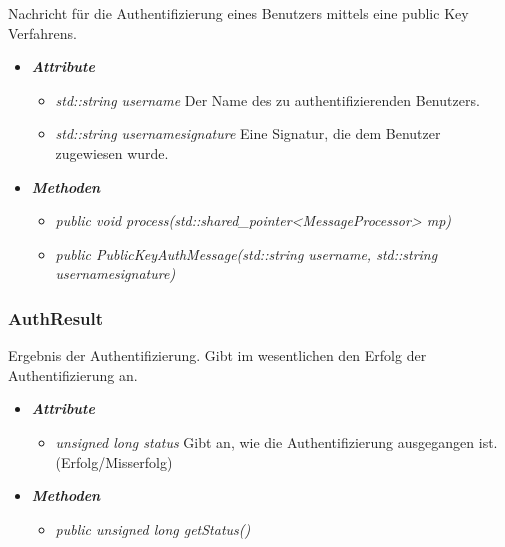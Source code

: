 \documentclass[a4paper,12pt]{article}
\begin{document}
Nachricht für die Authentifizierung eines Benutzers mittels eine public Key Verfahrens.

	\begin{itemize}[label={}]

	\item\textit{\textbf{Attribute}}
		\begin{itemize}[label={\textbullet}]
			
			\item\textit{std::string username} Der Name des zu authentifizierenden Benutzers.
			\item\textit{std::string usernamesignature} Eine Signatur, die dem Benutzer zugewiesen wurde.
		\end{itemize}

	\item\textit{\textbf{Methoden}}
		\begin{itemize}[label={\textbullet}]
			\item\textit{public void process(std::shared\_pointer<MessageProcessor> mp)}
			\item\textit{public PublicKeyAuthMessage(std::string username, std::string usernamesignature)}
		\end{itemize}

\end{itemize}


\subsubsection{AuthResult}

Ergebnis der Authentifizierung. Gibt im wesentlichen den Erfolg der Authentifizierung an.

	\begin{itemize}[label={}]

	\item\textit{\textbf{Attribute}}
		\begin{itemize}[label={\textbullet}]
			\item\textit{unsigned long status} Gibt an, wie die Authentifizierung ausgegangen ist. (Erfolg/Misserfolg)
		\end{itemize}

	\item\textit{\textbf{Methoden}}
		\begin{itemize}[label={\textbullet}]
			\item\textit{public unsigned long getStatus()}
		\end{itemize}

\end{itemize}
\end{document}
